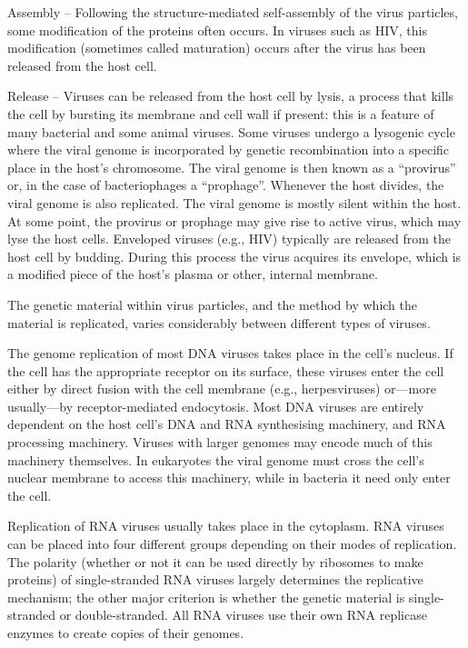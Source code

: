 Assembly -- Following the structure-mediated self-assembly of the virus particles, some modification of the proteins often occurs. In viruses such as HIV, this modification (sometimes called maturation) occurs after the virus has been released from the host cell.

Release -- Viruses can be released from the host cell by lysis, a process that kills the cell by bursting its membrane and cell wall if present: this is a feature of many bacterial and some animal viruses. Some viruses undergo a lysogenic cycle where the viral genome is incorporated by genetic recombination into a specific place in the host's chromosome. The viral genome is then known as a ``provirus'' or, in the case of bacteriophages a ``prophage''. Whenever the host divides, the viral genome is also replicated. The viral genome is mostly silent within the host. At some point, the provirus or prophage may give rise to active virus, which may lyse the host cells. Enveloped viruses (e.g., HIV) typically are released from the host cell by budding. During this process the virus acquires its envelope, which is a modified piece of the host's plasma or other, internal membrane.

The genetic material within virus particles, and the method by which the material is replicated, varies considerably between different types of viruses.

The genome replication of most DNA viruses takes place in the cell's nucleus. If the cell has the appropriate receptor on its surface, these viruses enter the cell either by direct fusion with the cell membrane (e.g., herpesviruses) or---more usually---by receptor-mediated endocytosis. Most DNA viruses are entirely dependent on the host cell's DNA and RNA synthesising machinery, and RNA processing machinery. Viruses with larger genomes may encode much of this machinery themselves. In eukaryotes the viral genome must cross the cell's nuclear membrane to access this machinery, while in bacteria it need only enter the cell.

Replication of RNA viruses usually takes place in the cytoplasm. RNA viruses can be placed into four different groups depending on their modes of replication. The polarity (whether or not it can be used directly by ribosomes to make proteins) of single-stranded RNA viruses largely determines the replicative mechanism; the other major criterion is whether the genetic material is single-stranded or double-stranded. All RNA viruses use their own RNA replicase enzymes to create copies of their genomes.

